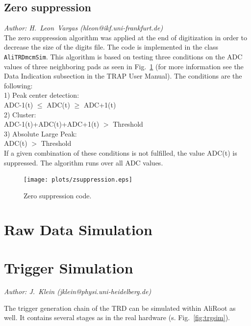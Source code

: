 \documentclass{alicetdr}
\begin{document}
\subsection{Zero suppression}
\label{DIGITS:zs}
%
{\it Author: H.~Leon~Vargas (hleon@ikf.uni-frankfurt.de)}
\smallskip
\\
%
The zero suppression algorithm was applied at the end of digitization
in order to decrease the size of the digits file. The code is implemented
in the class {\tt AliTRDmcmSim}.  This algorithm is based on testing
three conditions on the ADC values of three neighboring pads as seen
in Fig.~\ref{FIG_DIG:zs} (for more information see the Data Indication
subsection in the TRAP User Manual). The conditions are the following:\\

1) Peak center detection:\\

ADC-1(t) $\leq$ ADC(t) $\geq$ ADC+1(t)\\

2) Cluster:\\

ADC-1(t)+ADC(t)+ADC+1(t) $>$ Threshold\\

3) Absolute Large Peak:\\

ADC(t) $>$ Threshold\\

If a given combination of these conditions is not fulfilled, the value ADC(t)
is suppressed. The algorithm runs over all ADC values.
%
\begin{figure}[htb]
\begin{center}
\texttt{[image: plots/zsuppression.eps]}
\end{center}
\caption{
Zero suppression code.
}
\label{FIG_DIG:zs}
\end{figure}
%
\section{Raw Data Simulation}
\label{RAWSIM}
%
\section{Trigger Simulation}
\label{TRGSIM}
{\it Author: J.~Klein (jklein@physi.uni-heidelberg.de)}
\vspace{.3cm}

The trigger generation chain of the TRD can be simulated within
AliRoot as well. It contains several stages as in the real
hardware (s. Fig.~\ref{fig:trgsim}).
\end{document}
